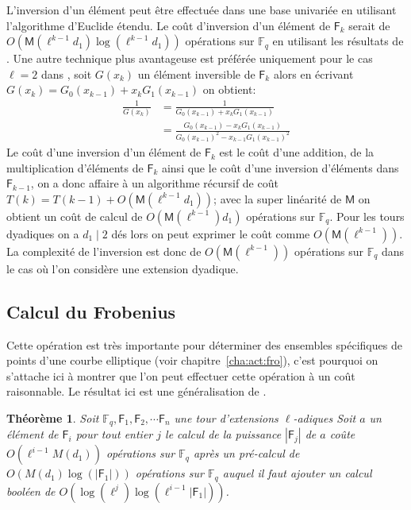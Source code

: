 \documentclass[10pt,a4paper]{book}
\theoremstyle{plain}
\newtheorem{thm}{Théorème}[chapter]
\theoremstyle{definition}
\theoremstyle{definition}
\theoremstyle{definition}
\theoremstyle{definition}
\theoremstyle{definition}
\theoremstyle{remark}
\theoremstyle{remark}
\theoremstyle{definition}
\begin{document}
L'inversion d'un élément peut être effectuée dans une base univariée en utilisant l'algorithme d'Euclide étendu. Le coût d'inversion d'un élément de $\mathsf{F}_k$ serait de $O(\mathsf{M}(\ell^{k-1}d_1)\log(\ell^{k-1}d_1))$ opérations sur $\mathbb{F}_q$ en utilisant les résultats de \cite[ch.11]{vzGJG03}. Une autre technique plus avantageuse est préférée uniquement pour le cas $\ell=2$ dans \cite{Doliskani-Schost15}, soit $G(x_k)$ un élément inversible de $\mathsf{F}_k$ alors en écrivant $G(x_k)=G_0(x_{k-1})+x_kG_1(x_{k-1})$ on obtient:
\begin{align*}
\frac{1}{G(x_k)} &=\frac{1}{G_0(x_{k-1})+x_kG_1(x_{k-1})} \\
 				&= \frac{G_0(x_{k-1})-x_kG_1(x_{k-1})}{G_0(x_{k-1})^2-x_{k-1}G_1(x_{k-1})^2}
\end{align*}
Le coût d'une inversion d'un élément de $\mathsf{F}_k$ est le coût d'une addition, de la multiplication d'éléments de $\mathsf{F}_k$ ainsi que le coût d'une inversion d'éléments dans $\mathsf{F}_{k-1}$, on a donc affaire à un algorithme récursif de coût  $T(k)=T(k-1)+O(\mathsf{M}(\ell^{k-1}d_1))$; avec la super linéarité de $\mathsf{M}$ on obtient un coût de calcul de $O(\mathsf{M}(\ell^{k-1})d_1)$ opérations sur $\mathbb{F}_q$. Pour les tours dyadiques on a $d_1 \mid 2$ dés lors on peut exprimer le coût comme $O(\mathsf{M}(\ell^{k-1}))$. La complexité de l'inversion est donc de $O(\mathsf{M}(\ell^{k-1}))$ opérations sur $\mathbb{F}_q$ dans le cas où l'on considère une extension dyadique.

\subsection*{Calcul du Frobenius}

Cette opération est très importante pour déterminer des ensembles spécifiques de points d'une courbe elliptique (voir chapitre~\ref{cha:act:fro}), c'est pourquoi on s'attache ici à montrer que l'on peut effectuer cette opération à un coût raisonnable. Le résultat ici est une généralisation de \cite{Doliskani-Schost15}.

\begin{thm} \label{thm:frob-ell}
Soit $\mathbb{F}_q, \mathsf{F}_1, \mathsf{F}_2,  \cdots \mathsf{F}_n$ une tour d'extensions $\ell$-adiques
Soit $a$ un élément de $\mathsf{F}_i$ pour tout entier $j$ le calcul de la puissance $|\mathsf{F}_j|$ de $a$ coûte
 $O(\ell^{i-1}M(d_1))$ opérations sur $\mathbb{F}_q$ après un pré-calcul de $O( M(d_1)\log(|\mathsf{F}_1|))$ opérations sur $\mathbb{F}_q$
auquel il faut ajouter un calcul booléen de $O(\log(\ell^j)\log(\ell^{i-1}|\mathsf{F}_1|))$.
\end{thm} 
\end{document}
